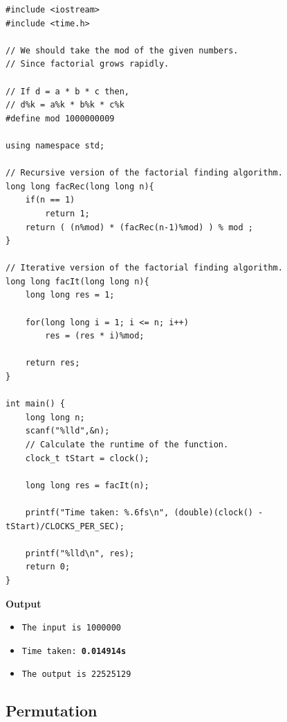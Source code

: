 \documentclass[12pt]{article}
\begin{document}
\begin{verbatim}
#include <iostream>
#include <time.h>

// We should take the mod of the given numbers.
// Since factorial grows rapidly.

// If d = a * b * c then,
// d%k = a%k * b%k * c%k
#define mod 1000000009

using namespace std;

// Recursive version of the factorial finding algorithm.
long long facRec(long long n){
    if(n == 1)
        return 1;
    return ( (n%mod) * (facRec(n-1)%mod) ) % mod ;
}

// Iterative version of the factorial finding algorithm.
long long facIt(long long n){
    long long res = 1;
    
    for(long long i = 1; i <= n; i++)
        res = (res * i)%mod;
    
    return res;
}

int main() {
    long long n;
    scanf("%lld",&n);
    // Calculate the runtime of the function.
    clock_t tStart = clock();
    
    long long res = facIt(n);
    
    printf("Time taken: %.6fs\n", (double)(clock() - tStart)/CLOCKS_PER_SEC);
    
    printf("%lld\n", res);
    return 0;
}
\end{verbatim}
\textbf{Output}
\begin{itemize}
  \item \texttt{The input is 1000000} 
  \item \texttt{Time taken: \textbf{0.014914s}} 
  \item \texttt{The output is 22525129}
\end{itemize}
\subsection{Permutation}
\end{document}
